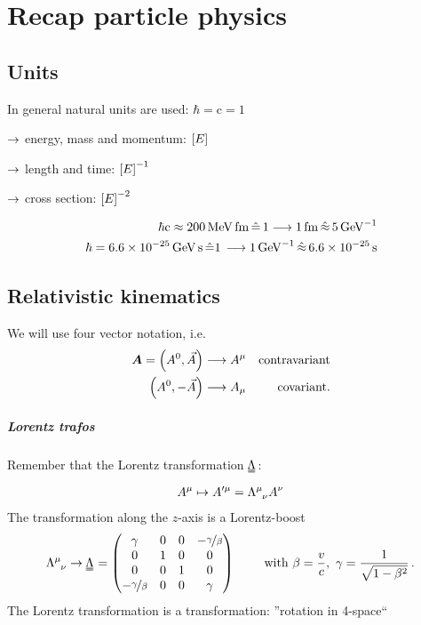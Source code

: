 \chapter{Recap particle physics}
\section{Units}
In general natural units are used: $\hbar = \mathrm c = 1$
\begin{compactitem}
    \item[$\rightarrow$] energy, mass and momentum: $\left[ E\right]$
    \item[$\rightarrow$] length and time: $\left[ E\right] ^{-1}$
    \item[$\rightarrow$] cross section: $\left[ E\right] ^{-2}$
\end{compactitem}
\begin{example}
\begin{align*}
    \hbar \mr c \approx \SI{200}{\mega\eV\femto\meter} \,\hat =\, 1 \longrightarrow \SI{1}{\femto \meter} \,\hat\approx\, \SI{5}{\per\giga\eV}\\
    \hbar = \SI{6.6 e-25}{\giga \eV \second} \,\hat = 1\, \longrightarrow \SI{1}{\per \giga \eV} \,\hat \approx\, \SI{6.6e-25}{\second}
\end{align*}
\end{example}
\section{Relativistic kinematics}
We will use four vector notation, i.e.
\begin{align}
    {\bm{A}} = \left( A^0, \vec A\right) \longrightarrow A^\mu & & \text{contravariant}\\
    \left( A^0, -\vec A\right) \longrightarrow A_\mu & & \text{covariant.}
\end{align}
\paragraph{Lorentz trafos}
Remember that the Lorentz transformation $\uul \Lambda$:
\begin{align}
    A^\mu \mapsto A'^\mu = \tensor{\Lambda}{^\mu_\nu}A^\nu
\end{align}
The transformation along the $z$-axis  is a Lorentz-boost
\begin{align}
    \tensor{\Lambda}{^\mu_\nu} \ra \uul \Lambda = \mat{\gamma & 0 &  0 &- \nicefrac \gamma \beta \\ 0 & 1 & 0 & 0 \\ 0 & 0 & 1 & 0 \\ - \nicefrac \gamma \beta & 0 & 0 & \gamma} \qquad \text{ with } \beta = \frac vc, \ \gamma = \frac{1}{\sqrt{1-\beta^2}}\,.
\end{align}
The Lorentz transformation is a  transformation: ''rotation in 4-space``
